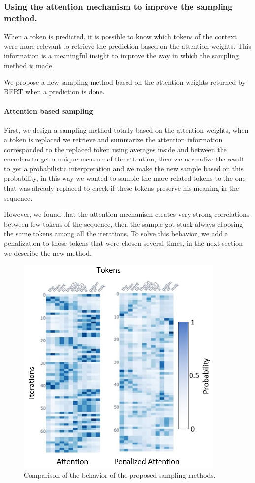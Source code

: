 \documentclass[10pt,twocolumn,letterpaper]{article}
\begin{document}
\subsubsection{Using the attention mechanism to improve the sampling method.}
When a token is predicted, it is possible to know which tokens of the context were more relevant to
retrieve the prediction based on the attention weights.
This information is a meaningful insight to improve
the way in which the sampling method is made.

We propose a new sampling method based on the attention
weights returned by BERT when a prediction is done.

\paragraph{Attention based sampling}
First, we design a sampling method totally based on the attention weights, when a token is replaced we retrieve
and summarize the attention information corresponded to the replaced token using averages inside and between the
encoders to get a unique measure of the attention, then we normalize the result to get a probabilistic interpretation
and we make the new sample based on this probability, in this way we wanted to sample the more related tokens to the one
that was already replaced to check if these tokens preserve his meaning in the sequence.

However, we found that the attention mechanism creates very strong correlations between
few tokens of the sequence, then the sample got stuck always choosing the same tokens among
all the iterations.
To solve this behavior, we add a penalization to those tokens that were
chosen several times, in the next section we describe the new method.

\begin{figure}
   \centering
   \includegraphics[scale=0.7]{attComp.PNG}
   \caption{Comparison of the behavior of the proposed sampling methods.}
   \label{fig:AttentComp}
\end{figure}
\end{document}
